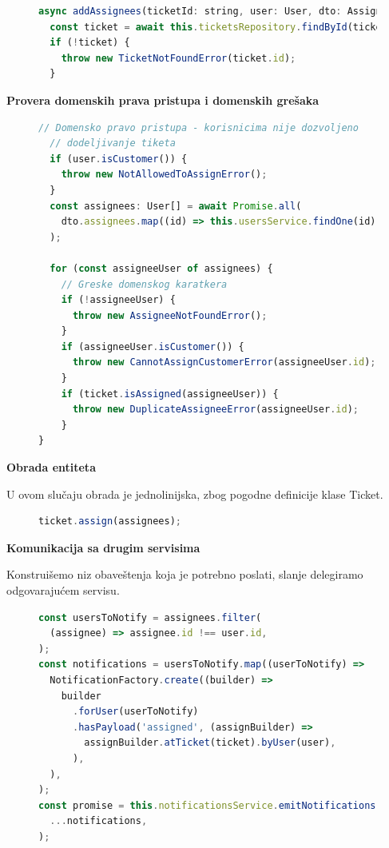 \documentclass[12pt,oneside]{memoir}
\begin{document}
\begin{figure}[h]
\begin{lstlisting}[language=JavaScript, style=ES6, caption={Korak dohvatanja tiketa.}]
async addAssignees(ticketId: string, user: User, dto: AssignDTO) {
  const ticket = await this.ticketsRepository.findById(ticketId);
  if (!ticket) {
    throw new TicketNotFoundError(ticket.id);
  }
\end{lstlisting}
\end{figure}

\textbf{Provera domenskih prava pristupa i domenskih grešaka}
\begin{figure}[h]
\begin{lstlisting}[language=JavaScript, style=ES6, caption={Korak provere domenskih prava pristupa i domenskih grešaka.}]
  // Domensko pravo pristupa - korisnicima nije dozvoljeno
  // dodeljivanje tiketa
  if (user.isCustomer()) {
    throw new NotAllowedToAssignError();
  }
  const assignees: User[] = await Promise.all(
    dto.assignees.map((id) => this.usersService.findOne(id)),
  );

  for (const assigneeUser of assignees) {
    // Greske domenskog karatkera
    if (!assigneeUser) {
      throw new AssigneeNotFoundError();
    }
    if (assigneeUser.isCustomer()) {
      throw new CannotAssignCustomerError(assigneeUser.id);
    }
    if (ticket.isAssigned(assigneeUser)) {
      throw new DuplicateAssigneeError(assigneeUser.id);
    }
}
\end{lstlisting}
\end{figure}

\newpage
\textbf{Obrada entiteta}

U ovom slučaju obrada je jednolinijska, zbog pogodne definicije klase Ticket.
\begin{figure}[h]
\begin{lstlisting}[language=JavaScript, style=ES6, caption={Korak obrade entiteta.}]
ticket.assign(assignees);
\end{lstlisting}
\end{figure}

\textbf{Komunikacija sa drugim servisima}

Konstruišemo niz obaveštenja koja je potrebno poslati, slanje delegiramo odgovarajućem servisu.
\begin{figure}[h]
\begin{lstlisting}[language=JavaScript, style=ES6, caption={Korak komunikacije sa drugim servisima.}]
const usersToNotify = assignees.filter(
  (assignee) => assignee.id !== user.id,
);
const notifications = usersToNotify.map((userToNotify) =>
  NotificationFactory.create((builder) =>
    builder
      .forUser(userToNotify)
      .hasPayload('assigned', (assignBuilder) =>
        assignBuilder.atTicket(ticket).byUser(user),
      ),
  ),
);
const promise = this.notificationsService.emitNotifications(
  ...notifications,
);
\end{lstlisting}
\end{figure}
\end{document}
